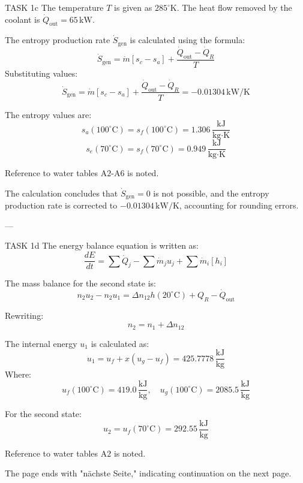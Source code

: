 TASK 1c  
The temperature \( T \) is given as \( 285^\circ \text{K} \). The heat flow removed by the coolant is \( \dot{Q}_{\text{out}} = 65 \, \text{kW} \).  

The entropy production rate \( \dot{S}_{\text{gen}} \) is calculated using the formula:  
\[
\dot{S}_{\text{gen}} = \dot{m} \left[ s_c - s_a \right] + \frac{\dot{Q}_{\text{out}} - \dot{Q}_R}{T}
\]  
Substituting values:  
\[
\dot{S}_{\text{gen}} = \dot{m} \left[ s_c - s_a \right] + \frac{\dot{Q}_{\text{out}} - \dot{Q}_R}{T} = -0.01304 \, \text{kW/K}
\]  

The entropy values are:  
\[
s_a(100^\circ \text{C}) = s_f(100^\circ \text{C}) = 1.306 \, \frac{\text{kJ}}{\text{kg·K}}
\]  
\[
s_e(70^\circ \text{C}) = s_f(70^\circ \text{C}) = 0.949 \, \frac{\text{kJ}}{\text{kg·K}}
\]  

Reference to water tables \( \text{A2-A6} \) is noted.  

The calculation concludes that \( \dot{S}_{\text{gen}} = 0 \) is not possible, and the entropy production rate is corrected to \( -0.01304 \, \text{kW/K} \), accounting for rounding errors.  

---

TASK 1d  
The energy balance equation is written as:  
\[
\frac{dE}{dt} = \sum \dot{Q}_j - \sum \dot{m}_j u_j + \sum \dot{m}_i \left[ h_i \right]
\]  

The mass balance for the second state is:  
\[
n_2 u_2 - n_2 u_1 = \Delta n_{12} h(20^\circ \text{C}) + Q_R - \dot{Q}_{\text{out}}
\]  

Rewriting:  
\[
n_2 = n_1 + \Delta n_{12}
\]  

The internal energy \( u_1 \) is calculated as:  
\[
u_1 = u_{f} + x \left( u_{g} - u_{f} \right) = 425.7778 \, \frac{\text{kJ}}{\text{kg}}
\]  
Where:  
\[
u_f(100^\circ \text{C}) = 419.0 \, \frac{\text{kJ}}{\text{kg}}, \quad u_g(100^\circ \text{C}) = 2085.5 \, \frac{\text{kJ}}{\text{kg}}
\]  

For the second state:  
\[
u_2 = u_f(70^\circ \text{C}) = 292.55 \, \frac{\text{kJ}}{\text{kg}}
\]  

Reference to water tables \( \text{A2} \) is noted.  

The page ends with "nächste Seite," indicating continuation on the next page.